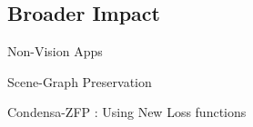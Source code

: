 \begin{refsection}
\section{Broader Impact} 
\label{sec:timeline}

Non-Vision Apps

Scene-Graph Preservation

Condensa-ZFP : Using New Loss functions

\end{refsection}